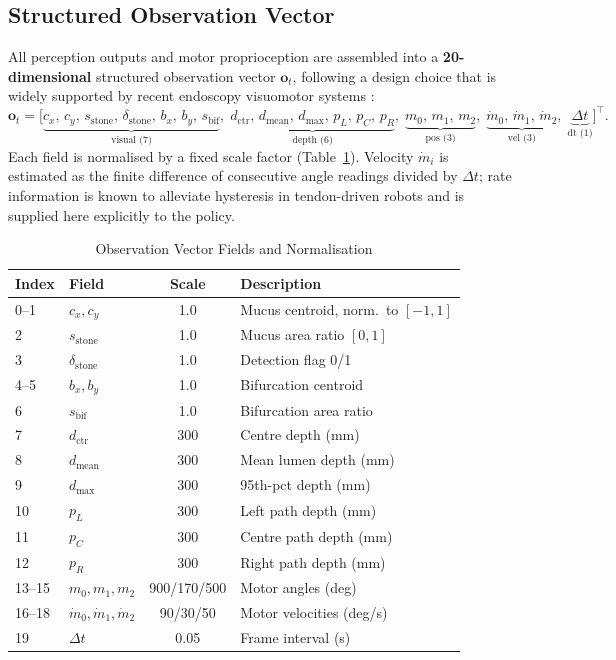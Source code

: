 \documentclass[journal,comsoc]{IEEEtran}
\newcommand{\obs}{\mathbf{o}}
\begin{document}
\subsection{Structured Observation Vector}
All perception outputs and motor proprioception are assembled into a
\textbf{20-dimensional} structured observation vector $\obs_t$,
following a design choice that is widely supported by recent
endoscopy visuomotor systems \cite{li2024east,longshort2026}:
\begin{equation}
  \obs_t = \bigl[
    \underbrace{c_x,\,c_y,\,s_\text{stone},\,\delta_\text{stone},\,
                b_x,\,b_y,\,s_\text{bif}}_{\text{visual (7)}},\;
    \underbrace{d_\text{ctr},\,d_\text{mean},\,d_\text{max},\,
                p_L,\,p_C,\,p_R}_{\text{depth (6)}},\;
    \underbrace{m_0,\,m_1,\,m_2}_{\text{pos (3)}},\;
    \underbrace{\dot m_0,\,\dot m_1,\,\dot m_2}_{\text{vel (3)}},\;
    \underbrace{\Delta t}_{\text{dt (1)}}
  \bigr]^\top.
  \label{eq:obs}
\end{equation}
Each field is normalised by a fixed scale factor
(Table~\ref{tab:obs_fields}). Velocity $\dot{m}_i$ is estimated as
the finite difference of consecutive angle readings divided by
$\Delta t$; rate information is known to alleviate hysteresis in
tendon-driven robots \cite{cho2024hysteresis} and is supplied here
explicitly to the policy.

\begin{table}[t]
\caption{Observation Vector Fields and Normalisation}
\label{tab:obs_fields}
\centering
\small
\begin{tabular}{llcl}
\toprule
Index & Field & Scale & Description \\
\midrule
0--1 & $c_x, c_y$          & 1.0   & Mucus centroid, norm.\ to $[-1,1]$ \\
2    & $s_\text{stone}$     & 1.0   & Mucus area ratio $[0,1]$ \\
3    & $\delta_\text{stone}$& 1.0   & Detection flag 0/1 \\
4--5 & $b_x, b_y$          & 1.0   & Bifurcation centroid \\
6    & $s_\text{bif}$       & 1.0   & Bifurcation area ratio \\
7    & $d_\text{ctr}$       & 300   & Centre depth (mm) \\
8    & $d_\text{mean}$      & 300   & Mean lumen depth (mm) \\
9    & $d_\text{max}$       & 300   & 95th-pct depth (mm) \\
10   & $p_L$                & 300   & Left path depth (mm) \\
11   & $p_C$                & 300   & Centre path depth (mm) \\
12   & $p_R$                & 300   & Right path depth (mm) \\
13--15 & $m_0, m_1, m_2$   & 900/170/500 & Motor angles (deg) \\
16--18 & $\dot m_0,\dot m_1,\dot m_2$ & 90/30/50 & Motor velocities (deg/s) \\
19   & $\Delta t$           & 0.05  & Frame interval (s) \\
\bottomrule
\end{tabular}
\end{table}
\end{document}
